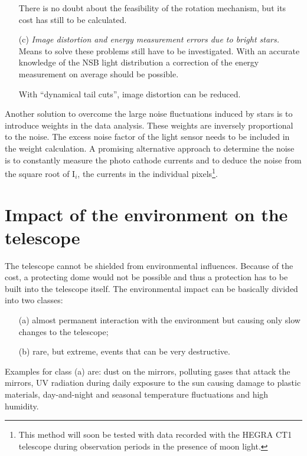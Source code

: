 \begin{itemize}
There is no doubt about the feasibility of the rotation mechanism, but 
its cost has still to be calculated.

\item[(c)]  {\em Image distortion and energy measurement errors due to
bright stars.}\newline
Means to solve these problems still have to be investigated. With an
accurate knowledge of the NSB light distribution a correction of the energy
measurement on average should be possible.

With ``dynamical tail cuts'', image distortion can be reduced.
\end{itemize}

Another solution to overcome the large noise fluctuations induced by stars
is to introduce weights in the data analysis. These weights are inversely
proportional to the noise. The excess noise factor of the light sensor needs
to be included in the weight calculation. A promising alternative approach to determine 
the noise is to constantly measure the photo cathode currents and to deduce
the noise from the square root of I$_i$, the currents in the individual
pixels\footnote{This method will soon be tested with data recorded with
the HEGRA CT1 telescope during observation periods in the
presence of moon light.}.

\section{Impact of the environment on the telescope}


\medskip The telescope cannot be shielded from environmental influences.
Because of the cost, a protecting dome would not be possible and thus a
protection has to be built into the telescope itself. The environmental
impact can be basically divided into two classes:

\begin{itemize}
\item[(a)]  almost permanent interaction with the environment but causing
only slow changes to the telescope;

\item[(b)]  rare, but extreme, events that can be very destructive.
\end{itemize}

Examples for class (a) are: dust on the mirrors, polluting gases that attack
the mirrors, UV radiation during daily exposure to the sun causing damage to
plastic materials, day-and-night and seasonal temperature fluctuations and high
humidity.

